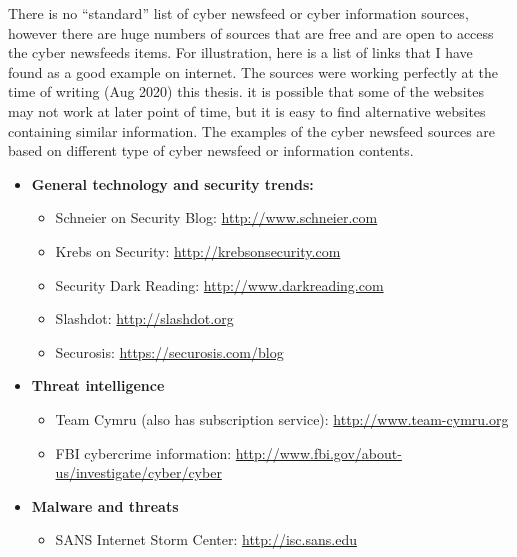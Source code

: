 There is no “standard” list of 
cyber newsfeed or cyber information sources, 
however there are huge numbers of sources that are free and 
are open to access the cyber newsfeeds items. 
For illustration, 
here is a list of links that I have found as a good example on internet. 
The sources were working perfectly at the time of writing (Aug 2020) this thesis.
it is possible that some of the websites 
may not work at later point of time, 
but it is easy to find alternative websites containing similar information. 
The examples of the cyber newsfeed sources 
are based on different type of cyber newsfeed 
or information contents.

\begin{itemize}
    \item \textbf{General technology and security trends:} 
        \begin{itemize}
            \item Schneier on Security Blog: 
            \url{http://www.schneier.com} 
            
            \item Krebs on Security: 
            \url{http://krebsonsecurity.com}
            
            \item Security Dark Reading: 
            \url{http://www.darkreading.com}
            
            \item Slashdot: 
            \url{http://slashdot.org}
            
            \item Securosis: 
            \url{https://securosis.com/blog}
            
        \end{itemize}

    \item \textbf{Threat intelligence }
        \begin{itemize}
            \item Team Cymru (also has subscription service): 
            \url{http://www.team-cymru.org}
            
            \item FBI cybercrime information: 
            \url{http://www.fbi.gov/about-us/investigate/cyber/cyber}
            
        \end{itemize}
        
    \item \textbf{Malware and threats }
        \begin{itemize}
            \item SANS Internet Storm Center: 
            \url{http://isc.sans.edu}
            

\end{itemize}
\end{itemize}
